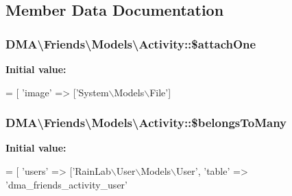\subsection{Member Data Documentation}
\hypertarget{classDMA_1_1Friends_1_1Models_1_1Activity_a9911cb733cbc863cc1bdccde254404b5}{}
\subsubsection[{\$attach\+One}]{\setlength{\rightskip}{0pt plus 5cm}D\+M\+A\textbackslash{}\+Friends\textbackslash{}\+Models\textbackslash{}\+Activity\+::\$attach\+One}\label{classDMA_1_1Friends_1_1Models_1_1Activity_a9911cb733cbc863cc1bdccde254404b5}
{\bfseries Initial value\+:}
\begin{DoxyCode}
= [
        \textcolor{stringliteral}{'image'} => [\textcolor{stringliteral}{'System\(\backslash\)Models\(\backslash\)File'}]
\end{DoxyCode}
\hypertarget{classDMA_1_1Friends_1_1Models_1_1Activity_ae5245e6eb74228cd54d8ae77e5a9bb38}{}
\subsubsection[{\$belongs\+To\+Many}]{\setlength{\rightskip}{0pt plus 5cm}D\+M\+A\textbackslash{}\+Friends\textbackslash{}\+Models\textbackslash{}\+Activity\+::\$belongs\+To\+Many}\label{classDMA_1_1Friends_1_1Models_1_1Activity_ae5245e6eb74228cd54d8ae77e5a9bb38}
{\bfseries Initial value\+:}
\begin{DoxyCode}
= [
        \textcolor{stringliteral}{'users'} => [\textcolor{stringliteral}{'RainLab\(\backslash\)User\(\backslash\)Models\(\backslash\)User'}, \textcolor{stringliteral}{'table'} => \textcolor{stringliteral}{'dma\_friends\_activity\_user'}
\end{DoxyCode}
\hypertarget{classDMA_1_1Friends_1_1Models_1_1Activity_a8b255e9889df95f8c702b72ed49ace25}{}

